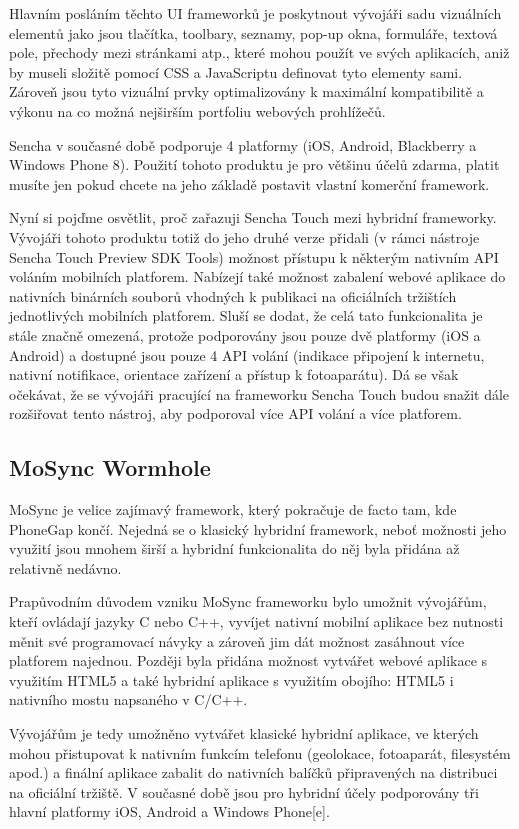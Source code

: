 Hlavním posláním těchto UI frameworků je poskytnout vývojáři sadu vizuálních elementů jako jsou tlačítka, toolbary, seznamy, pop-up okna, formuláře, textová pole, přechody mezi stránkami atp., které mohou použít ve svých aplikacích, aniž by museli složitě pomocí CSS a JavaScriptu definovat tyto elementy sami. Zároveň jsou tyto vizuální prvky optimalizovány k maximální kompatibilitě a výkonu na co možná nejširším portfoliu webových prohlížečů.

Sencha v současné době podporuje 4 platformy (iOS, Android, Blackberry a Windows Phone 8). Použití tohoto produktu je pro většinu účelů zdarma, platit musíte jen pokud chcete na jeho základě postavit vlastní komerční framework.

Nyní si pojďme osvětlit, proč zařazuji Sencha Touch mezi hybridní frameworky. Vývojáři tohoto produktu totiž do jeho druhé verze přidali (v rámci nástroje Sencha Touch Preview SDK Tools) možnost přístupu k některým nativním API voláním mobilních platforem. Nabízejí také možnost zabalení webové aplikace do nativních binárních souborů vhodných k publikaci na oficiálních tržištích jednotlivých mobilních platforem. Sluší se dodat, že celá tato funkcionalita je stále značně omezená, protože podporovány jsou pouze dvě platformy (iOS a Android) a dostupné jsou pouze 4 API volání (indikace připojení k internetu, nativní notifikace, orientace zařízení a přístup k fotoaparátu). Dá se však očekávat, že se vývojáři pracující na frameworku Sencha Touch budou snažit dále rozšiřovat tento nástroj, aby podporoval více API volání a více platforem.

\subsection{MoSync Wormhole}
MoSync je velice zajímavý framework, který pokračuje de facto tam, kde PhoneGap končí. Nejedná se o klasický hybridní framework, neboť možnosti jeho využití jsou mnohem širší a hybridní funkcionalita do něj byla přidána až relativně nedávno.

Prapůvodním důvodem vzniku MoSync frameworku bylo umožnit vývojářům, kteří ovládají jazyky C nebo C++, vyvíjet nativní mobilní aplikace bez nutnosti měnit své programovací návyky a zároveň jim dát možnost zasáhnout více platforem najednou. Později byla přidána možnost vytvářet webové aplikace s využitím HTML5 a také hybridní aplikace s využitím obojího: HTML5 i nativního mostu napsaného v C/C++.

Vývojářům je tedy umožněno vytvářet klasické hybridní aplikace, ve kterých mohou přistupovat k nativním funkcím telefonu (geolokace, fotoaparát, filesystém apod.) a finální aplikace zabalit do nativních balíčků připravených na distribuci na oficiální tržiště. V současné době jsou pro hybridní účely podporovány tři hlavní platformy iOS, Android a Windows Phone[e].

